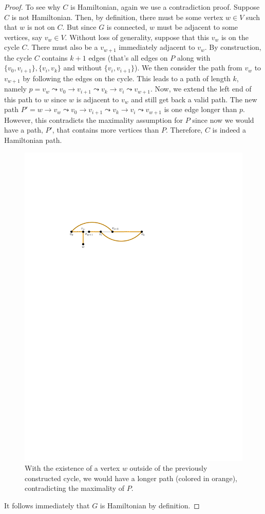 \begin{proof}
    To see why $C$ is Hamiltonian, again we use a contradiction proof. Suppose $C$ is not Hamiltonian. Then, by definition, there must be some vertex $w \in V$ such that $w$ is not on $C$. But since $G$ is connected, $w$ must be adjacent to some vertices, say $v_w \in V$. Without loss of generality, suppose that this $v_w$ is on the cycle $C$. There must also be a $v_{w+1}$ immediately adjacent to $v_w$. By construction, the cycle $C$ contains $k+1$ edges (that's all edges on $P$ along with $\{v_0,v_{i+1}\}, \{v_i,v_k\}$ and without $\{v_i,v_{i+1}\}$). We then consider the path from $v_w$ to $v_{w+1}$ by following the edges on the cycle. This leads to a path of length $k$, namely $p = v_w \leadsto v_0 \to v_{i+1} \leadsto v_k \to v_i \leadsto v_{w+1}$. Now, we extend the left end of this path to $w$ since $w$ is adjacent to $v_w$ and still get back a valid path. The new path $P' = w \to v_w \leadsto v_0 \to v_{i+1} \leadsto v_k \to v_i \leadsto v_{w+1}$ is one edge longer than $p$. However, this contradicts the maximality assumption for $P$ since now we would have a path, $P'$, that contains more vertices than $P$. Therefore, $C$ is indeed a Hamiltonian path.

    \begin{figure}[htbp]
        \centering
        \includegraphics[width=0.4\linewidth]{figures/dirac-thm-longer-path-contradiction.pdf}
        \caption{With the existence of a vertex $w$ outside of the previously constructed cycle, we would have a longer path (colored in orange), contradicting the maximality of $P$.}
        \label{fig:dirac-thm-path-contradiction}
    \end{figure}

    It follows immediately that $G$ is Hamiltonian by definition.
\end{proof}

